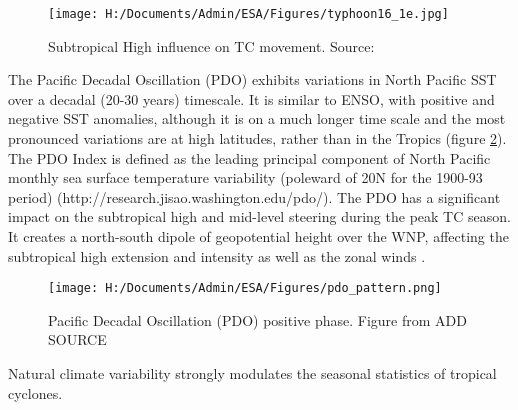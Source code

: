 \begin{figure}[h]
	\centering
	\noindent\texttt{[image: H:/Documents/Admin/ESA/Figures/typhoon16\_1e.jpg]}
	\caption{Subtropical High influence on TC movement. Source: }\label{fig:STH}
\end{figure}

The Pacific Decadal Oscillation (PDO) exhibits variations in North Pacific SST over a decadal (20-30 years) timescale. It is similar to ENSO, with positive and negative SST anomalies, although it is on a much longer time scale and the most pronounced variations are at high latitudes, rather than in the Tropics  (figure \ref{fig:PDO}). The PDO Index is defined as the leading principal component of North Pacific monthly sea surface temperature variability (poleward of 20N for the 1900-93 period) (http://research.jisao.washington.edu/pdo/). The PDO has a significant impact on the subtropical high and mid-level steering during the peak TC season. It creates a north-south dipole of geopotential height over the WNP, affecting the subtropical high extension and intensity as well as the zonal winds \citep{liu2008interdecadal}.


\begin{figure}[h]
	\centering
	\noindent\texttt{[image: H:/Documents/Admin/ESA/Figures/pdo\_pattern.png]}
	\caption{Pacific Decadal Oscillation (PDO) positive phase. Figure from ADD SOURCE }\label{fig:PDO}
\end{figure}






Natural climate variability strongly modulates the seasonal statistics of tropical cyclones. 


